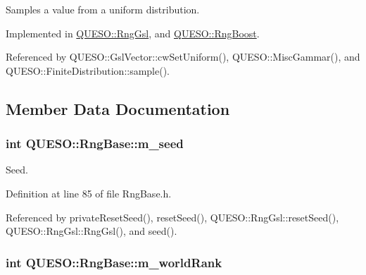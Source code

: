 Samples a value from a uniform distribution. 



Implemented in \hyperlink{class_q_u_e_s_o_1_1_rng_gsl_a903f2db902f287a0d7d85f68d95d7225}{Q\-U\-E\-S\-O\-::\-Rng\-Gsl}, and \hyperlink{class_q_u_e_s_o_1_1_rng_boost_aad1548eec706aeb6580af163bd80e0a9}{Q\-U\-E\-S\-O\-::\-Rng\-Boost}.



Referenced by Q\-U\-E\-S\-O\-::\-Gsl\-Vector\-::cw\-Set\-Uniform(), Q\-U\-E\-S\-O\-::\-Misc\-Gammar(), and Q\-U\-E\-S\-O\-::\-Finite\-Distribution\-::sample().



\subsection{Member Data Documentation}
\hypertarget{class_q_u_e_s_o_1_1_rng_base_ab67b3c940ba6ffb4f2d70079fe36e343}{
\subsubsection[{m\-\_\-seed}]{\setlength{\rightskip}{0pt plus 5cm}int Q\-U\-E\-S\-O\-::\-Rng\-Base\-::m\-\_\-seed\hspace{0.3cm}{\ttfamily [protected]}}}\label{class_q_u_e_s_o_1_1_rng_base_ab67b3c940ba6ffb4f2d70079fe36e343}


Seed. 



Definition at line 85 of file Rng\-Base.\-h.



Referenced by private\-Reset\-Seed(), reset\-Seed(), Q\-U\-E\-S\-O\-::\-Rng\-Gsl\-::reset\-Seed(), Q\-U\-E\-S\-O\-::\-Rng\-Gsl\-::\-Rng\-Gsl(), and seed().

\hypertarget{class_q_u_e_s_o_1_1_rng_base_a94515d2b7d493d8e4e238628716dd11b}{
\subsubsection[{m\-\_\-world\-Rank}]{\setlength{\rightskip}{0pt plus 5cm}int Q\-U\-E\-S\-O\-::\-Rng\-Base\-::m\-\_\-world\-Rank\hspace{0.3cm}{\ttfamily [protected]}}}\label{class_q_u_e_s_o_1_1_rng_base_a94515d2b7d493d8e4e238628716dd11b}


